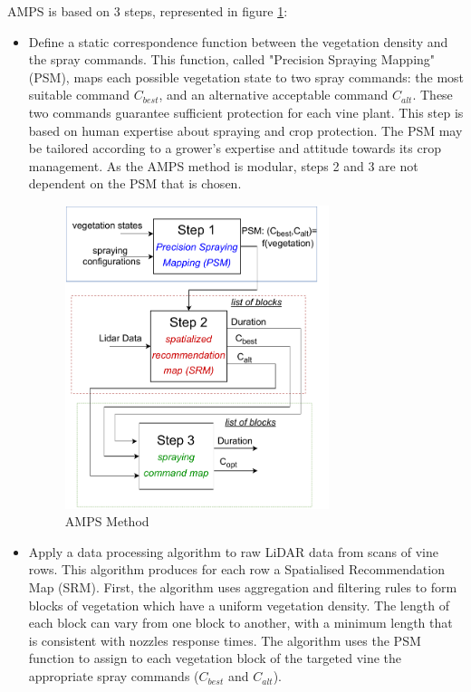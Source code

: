 \documentclass[preprint,3p,times,twocolumn]{elsarticle}
\begin{document}
AMPS is based on 3 steps, represented in figure \ref{fig:MethodoComplete}:
\begin{itemize}
\item [\textbf{Step 1:}] Define a static correspondence function between the vegetation density and the spray commands. This function, called "Precision Spraying Mapping" (PSM), maps each possible vegetation state to two spray commands: the most suitable command $C_{best}$, and an alternative acceptable command $C_{alt}$. These two commands guarantee sufficient protection for each vine plant. This step is based on human expertise about spraying and crop protection. The PSM may be tailored according to a grower's expertise and attitude towards its crop management. 
As the AMPS method is modular, steps 2 and 3 are not dependent on the PSM that is chosen.

\begin{figure}[ht!]
	\begin{center}
		\includegraphics[width=7.7cm]{export.pdf}
		\caption{AMPS Method} 
		\label{fig:MethodoComplete}
	\end{center}
\end{figure}    
\item [\textbf{Step 2:}] Apply a data processing algorithm to raw LiDAR data from scans of vine rows. This algorithm produces for each row a Spatialised Recommendation Map (SRM). 
First, the algorithm uses aggregation and filtering rules to form blocks of vegetation which have a uniform vegetation density. The length of each block can vary from one block to another, with a minimum length that is consistent with nozzles response times. The algorithm uses the PSM function to assign to each vegetation block of the targeted vine the appropriate spray commands ($C_{best}$ and $C_{alt}$).


\end{itemize}
\end{document}
